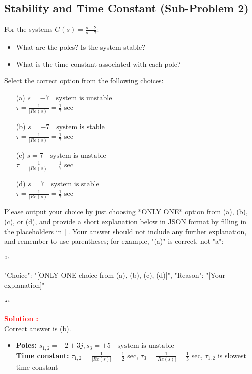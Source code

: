 \documentclass[12pt]{article}
\begin{document}
\subsection*{Stability and Time Constant (Sub-Problem 2)}

For the systems \(G(s) = \frac{s-2}{s+7}\):
\begin{itemize}
    \item What are the poles? Is the system stable?
    \item What is the time constant associated with each pole? 
\end{itemize}

Select the correct option from the following choices:
\begin{itemize}
    \item[(a)] \(s = -7 \quad \text{system is unstable}\)\\
     \(\tau = \frac{1}{|Re(s)|} = \frac{1}{7}\) sec
    \item[(b)] \(s = -7 \quad \text{system is stable}\)\\
     \(\tau = \frac{1}{|Re(s)|} = \frac{1}{7}\) sec
    \item[(c)] \(s = 7 \quad \text{system is unstable}\)\\
     \(\tau = \frac{1}{|Re(s)|} = \frac{1}{7}\) sec
    \item[(d)] \(s = 7 \quad \text{system is stable}\)\\
     \(\tau = \frac{1}{|Re(s)|} = \frac{1}{7}\) sec
\end{itemize}




Please output your choice by just choosing *ONLY ONE* option from (a), (b), (c), or (d), and provide a short explanation below in JSON format by filling in the placeholders in []. Your answer should not include any further explanation, and remember to use parentheses; for example, "(a)" is correct, not "a":

```

{
"Choice": "[ONLY ONE choice from (a), (b), (c), (d)]",
"Reason": "[Your explanation]"
}

```


\textbf{\textcolor{red}{Solution :}} \\
Correct answer is (b).\\
\begin{itemize}
 \item   \textbf{Poles:} \(s_{1,2} = -2 \pm 3j, s_3 = +5 \quad \text{system is unstable}\)\\
    \textbf{Time constant:} \(\tau_{1,2} = \frac{1}{|Re(s)|} = \frac{1}{2}\) sec, \(\tau_3 = \frac{1}{|Re(s)|} = \frac{1}{5}\) sec, \(\tau_{1,2}\) is slowest time constant
\end{itemize}
\clearpage
\end{document}
